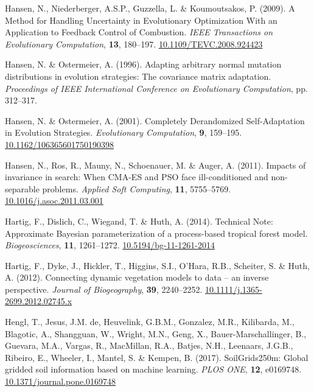 \documentclass[11pt,]{article}
\newlength{\cslhangindent}
\newenvironment{CSLReferences}[2] %
 {%
  \setlength{\parindent}{0pt}
  \ifodd #1 \everypar{\setlength{\hangindent}{\cslhangindent}}\ignorespaces\fi
  \ifnum #2 > 0
  \setlength{\parskip}{#2\baselineskip}
  \fi
 }%
 {}
\begin{document}
\begin{CSLReferences}{1}{0}
\leavevmode{}%
Hansen, N., Niederberger, A.S.P., Guzzella, L. \& Koumoutsakos, P.
(2009). A {Method} for {Handling} {Uncertainty} in {Evolutionary}
{Optimization} {With} an {Application} to {Feedback} {Control} of
{Combustion}. \emph{IEEE Transactions on Evolutionary Computation},
\textbf{13}, 180--197.
\href{https://doi.org/10.1109/TEVC.2008.924423}{10.1109/TEVC.2008.924423}

\leavevmode{}%
Hansen, N. \& Ostermeier, A. (1996). Adapting arbitrary normal mutation
distributions in evolution strategies: The covariance matrix adaptation.
\emph{Proceedings of {IEEE} {International} {Conference} on
{Evolutionary} {Computation}}, pp. 312--317.

\leavevmode{}%
Hansen, N. \& Ostermeier, A. (2001). Completely {Derandomized}
{Self}-{Adaptation} in {Evolution} {Strategies}. \emph{Evolutionary
Computation}, \textbf{9}, 159--195.
\href{https://doi.org/10.1162/106365601750190398}{10.1162/106365601750190398}

\leavevmode{}%
Hansen, N., Ros, R., Mauny, N., Schoenauer, M. \& Auger, A. (2011).
Impacts of invariance in search: {When} {CMA}-{ES} and {PSO} face
ill-conditioned and non-separable problems. \emph{Applied Soft
Computing}, \textbf{11}, 5755--5769.
\href{https://doi.org/10.1016/j.asoc.2011.03.001}{10.1016/j.asoc.2011.03.001}

\leavevmode{}%
Hartig, F., Dislich, C., Wiegand, T. \& Huth, A. (2014). Technical
{Note}: {Approximate} {Bayesian} parameterization of a process-based
tropical forest model. \emph{Biogeosciences}, \textbf{11}, 1261--1272.
\href{https://doi.org/10.5194/bg-11-1261-2014}{10.5194/bg-11-1261-2014}

\leavevmode{}%
Hartig, F., Dyke, J., Hickler, T., Higgins, S.I., O'Hara, R.B.,
Scheiter, S. \& Huth, A. (2012). Connecting dynamic vegetation models to
data -- an inverse perspective. \emph{Journal of Biogeography},
\textbf{39}, 2240--2252.
\href{https://doi.org/10.1111/j.1365-2699.2012.02745.x}{10.1111/j.1365-2699.2012.02745.x}

\leavevmode{}%
Hengl, T., Jesus, J.M. de, Heuvelink, G.B.M., Gonzalez, M.R., Kilibarda,
M., Blagotic, A., Shangguan, W., Wright, M.N., Geng, X.,
Bauer-Marschallinger, B., Guevara, M.A., Vargas, R., MacMillan, R.A.,
Batjes, N.H., Leenaars, J.G.B., Ribeiro, E., Wheeler, I., Mantel, S. \&
Kempen, B. (2017). {SoilGrids250m}: {Global} gridded soil information
based on machine learning. \emph{PLOS ONE}, \textbf{12}, e0169748.
\href{https://doi.org/10.1371/journal.pone.0169748}{10.1371/journal.pone.0169748}


\end{CSLReferences}
\end{document}
